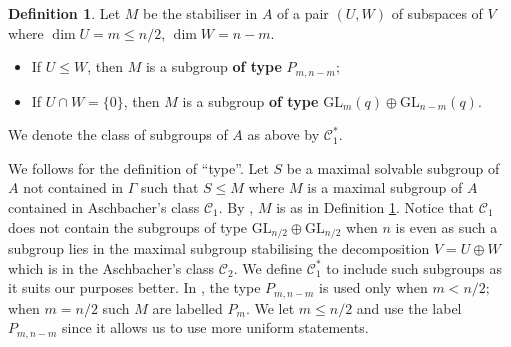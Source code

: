 \documentclass[a4paper,reqno,11pt]{amsart}
\theoremstyle{definition}
\newtheorem{Def}[Th]{Definition}
\theoremstyle{remark}
\numberwithin{equation}{section}
\newcommand{\GL}{{\mathrm{GL}}}
\begin{document}
\begin{Def}
\label{deftypepm}
 Let $M$ be the stabiliser in $A$ of a pair $(U,W)$ of subspaces of $V$ where $\dim U=m \le n/2$, $\dim W=n-m$. %
\begin{itemize}
\item If $U \le W$, then $M$ is a subgroup {\bf of type} $P_{m,n-m};$
\item If $U\cap W=\{0\}$, then $M$ is a subgroup {\bf of type} $\GL_m(q) \oplus \GL_{n-m}(q).$
\end{itemize}
We denote the class of subgroups of $A$ as above by $\mathcal{C}_1^*.$
\end{Def}
We follows \cite[\S 4.1]{kleidlieb} for the definition of ``type''. Let $S$  be a maximal solvable subgroup of $A$ not contained in $\Gamma$ such that $S \le M$ where $M$ is a maximal subgroup of $A$ contained in Aschbacher's class $\mathcal{C}_1.$ By \cite[\S 4.1]{kleidlieb}, $M$ is as in Definition \ref{deftypepm}.  Notice that  $\mathcal{C}_1$ does not contain the subgroups of type $\GL_{n/2} \oplus \GL_{n/2}$ when $n$ is even as such a subgroup lies in the maximal subgroup stabilising the decomposition $V=U \oplus W$ which is in the Aschbacher's class $\mathcal{C}_2.$ We define $\mathcal{C}_1^*$ to include such subgroups as it suits our purposes better.
In \cite[\S 4.1]{kleidlieb}, the type $P_{m,n-m}$ is used only when $m<n/2;$ when $m=n/2$ such $M$ are labelled $P_m$. We let $m \le n/2$ and use the label $P_{m,n-m}$ since it allows us to use more uniform statements.
\end{document}
